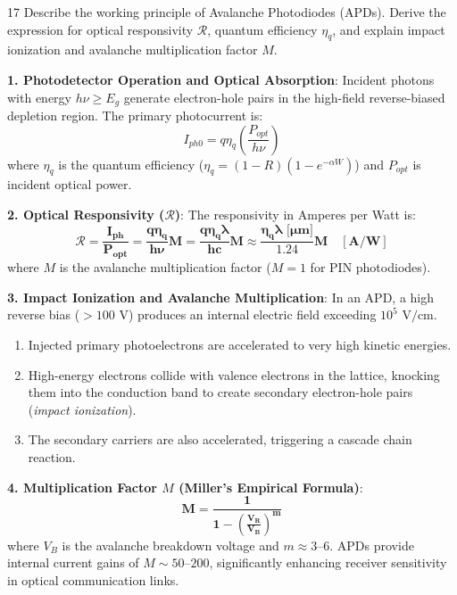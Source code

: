 \begin{theoryq}{17}
Describe the working principle of Avalanche Photodiodes (APDs). Derive the expression for optical responsivity $\mathcal{R}$, quantum efficiency $\eta_q$, and explain impact ionization and avalanche multiplication factor $M$.
\end{theoryq}
\begin{theorysol}
\textbf{1. Photodetector Operation and Optical Absorption}:
Incident photons with energy $h\nu \ge E_g$ generate electron-hole pairs in the high-field reverse-biased depletion region.
The primary photocurrent is:
\begin{equation}
I_{ph0} = q \eta_q \left(\frac{P_{opt}}{h\nu}\right)
\end{equation}
where $\eta_q$ is the quantum efficiency ($\eta_q = (1 - R)(1 - e^{-\alpha W})$) and $P_{opt}$ is incident optical power.

\textbf{2. Optical Responsivity ($\mathcal{R}$)}:
The responsivity in Amperes per Watt is:
\begin{equation}
\mathbf{\mathcal{R} = \frac{I_{ph}}{P_{opt}} = \frac{q \eta_q}{h\nu} M = \frac{q \eta_q \lambda}{h c} M \approx \frac{\eta_q \lambda\text{ [}\mu\text{m]}}{1.24} M\quad [\text{A/W}]}
\end{equation}
where $M$ is the avalanche multiplication factor ($M=1$ for PIN photodiodes).

\textbf{3. Impact Ionization and Avalanche Multiplication}:
In an APD, a high reverse bias ($>100\text{ V}$) produces an internal electric field exceeding $10^5\text{ V/cm}$.
\begin{enumerate}
\item Injected primary photoelectrons are accelerated to very high kinetic energies.
\item High-energy electrons collide with valence electrons in the lattice, knocking them into the conduction band to create secondary electron-hole pairs (\textit{impact ionization}).
\item The secondary carriers are also accelerated, triggering a cascade chain reaction.
\end{enumerate}

\textbf{4. Multiplication Factor $M$ (Miller's Empirical Formula)}:
\begin{equation}
\mathbf{M = \frac{1}{1 - \left(\frac{V_R}{V_B}\right)^m}}
\end{equation}
where $V_B$ is the avalanche breakdown voltage and $m \approx 3\text{--}6$.
APDs provide internal current gains of $M \sim 50\text{--}200$, significantly enhancing receiver sensitivity in optical communication links.
\end{theorysol}
\vspace{4mm}

